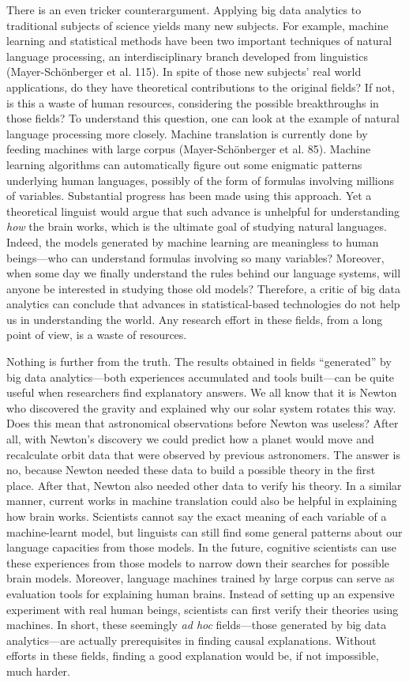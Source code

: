 \documentclass{writing}
\begin{document}
There is an even tricker counterargument. Applying big data analytics to
traditional subjects of science yields many new subjects. For example,
machine learning and statistical methods have been two important
techniques of natural language processing, an interdisciplinary branch
developed from linguistics (Mayer-Schönberger et al. 115). In spite of
those new subjects' real world applications, do they have theoretical
contributions to the original fields? If not, is this a waste of human
resources, considering the possible breakthroughs in those fields? To
understand this question, one can look at the example of natural
language processing more closely. Machine translation is currently done
by feeding machines with large corpus (Mayer-Schönberger et al. 85).
Machine learning algorithms can automatically figure out some enigmatic
patterns underlying human languages, possibly of the form of formulas
involving millions of variables. Substantial progress has been made
using this approach. Yet a theoretical linguist would argue that such
advance is unhelpful for understanding \emph{how} the brain works, which
is the ultimate goal of studying natural languages. Indeed, the models
generated by machine learning are meaningless to human beings---who can
understand formulas involving so many variables? Moreover, when some day
we finally understand the rules behind our language systems, will anyone
be interested in studying those old models? Therefore, a critic of big
data analytics can conclude that advances in statistical-based
technologies do not help us in understanding the world. Any research
effort in these fields, from a long point of view, is a waste of
resources.

Nothing is further from the truth. The results obtained in fields
``generated'' by big data analytics---both experiences accumulated and
tools built---can be quite useful when researchers find explanatory
answers. We all know that it is Newton who discovered the gravity and
explained why our solar system rotates this way. Does this mean that
astronomical observations before Newton was useless? After all, with
Newton's discovery we could predict how a planet would move and
recalculate orbit data that were observed by previous astronomers. The
answer is no, because Newton needed these data to build a possible
theory in the first place. After that, Newton also needed other data to
verify his theory. In a similar manner, current works in machine
translation could also be helpful in explaining how brain works.
Scientists cannot say the exact meaning of each variable of a
machine-learnt model, but linguists can still find some general patterns
about our language capacities from those models. In the future,
cognitive scientists can use these experiences from those models to
narrow down their searches for possible brain models. Moreover, language
machines trained by large corpus can serve as evaluation tools for
explaining human brains. Instead of setting up an expensive experiment
with real human beings, scientists can first verify their theories using
machines. In short, these seemingly \emph{ad hoc} fields---those
generated by big data analytics---are actually prerequisites in finding
causal explanations. Without efforts in these fields, finding a good
explanation would be, if not impossible, much harder.
\end{document}
